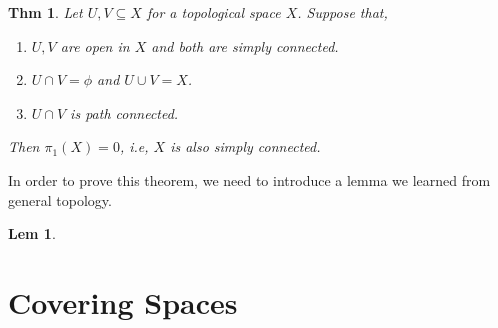 \documentclass[paper=a4, fontsize=11pt]{scrartcl}
\newtheorem{theorem}{Thm}
\newtheorem{lemma}{Lem}
\begin{document}
\begin{theorem}Let $U,V \subseteq X$ for a topological space $X$. Suppose that,
	\begin{enumerate}
		\item $U,V $ are open in $X$ and both are simply connected.
		\item $U \cap V = \phi$ and $U \cup V = X$.
		\item $U \cap V$ is path connected. 
	\end{enumerate}	
	Then $\pi_1(X)=0$, i.e, $X$ is also simply connected.
\end{theorem}

In order to prove this theorem, we need to introduce a lemma we learned from general topology. \\

\begin{lemma}
	
\end{lemma}

\section{Covering Spaces}
\end{document}
